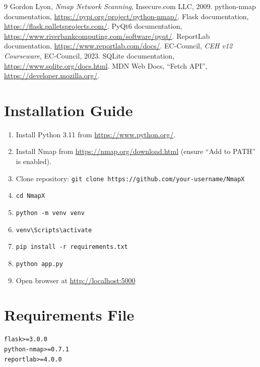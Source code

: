 \documentclass[12pt, a4paper]{report}
\begin{document}
\clearpage
\begin{thebibliography}{9}
 Gordon Lyon, \textit{Nmap Network Scanning}, Insecure.com LLC, 2009.
 python-nmap documentation, \url{https://pypi.org/project/python-nmap/}.
 Flask documentation, \url{https://flask.palletsprojects.com/}.
 PyQt6 documentation, \url{https://www.riverbankcomputing.com/software/pyqt/}.
 ReportLab documentation, \url{https://www.reportlab.com/docs/}.
 EC-Council, \textit{CEH v12 Courseware}, EC-Council, 2023.
 SQLite documentation, \url{https://www.sqlite.org/docs.html}.
 MDN Web Docs, ``Fetch API'', \url{https://developer.mozilla.org/}.
\end{thebibliography}

\clearpage
\appendix

\chapter{Installation Guide}
\label{app:install}
\begin{enumerate}[leftmargin=2.2em]
  \item Install Python 3.11 from \url{https://www.python.org/}.
  \item Install Nmap from \url{https://nmap.org/download.html} (ensure ``Add to PATH'' is enabled).
  \item Clone repository: \texttt{git clone https://github.com/your-username/NmapX}
  \item \texttt{cd NmapX}
  \item \texttt{python -m venv venv}
  \item \texttt{venv\textbackslash Scripts\textbackslash activate}
  \item \texttt{pip install -r requirements.txt}
  \item \texttt{python app.py}
  \item Open browser at \url{http://localhost:5000}
\end{enumerate}

\chapter{Requirements File}
\label{app:req}
\begin{lstlisting}[caption={requirements.txt},label={lst:req}]
flask>=3.0.0
python-nmap>=0.7.1
reportlab>=4.0.0
\end{lstlisting}
\end{document}
